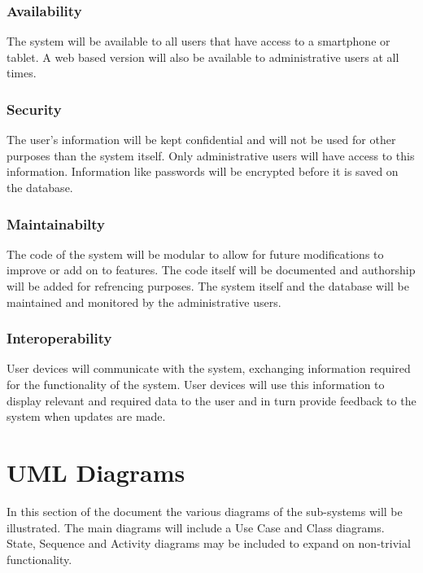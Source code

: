 \documentclass{article}
\begin{document}
		\subsubsection{Availability}
		The system will be available to all users that have access to a smartphone or tablet. A web based version will also be available to administrative users at all times.
		\subsubsection{Security}
		The user's information will be kept confidential and will not be used for other purposes than the system itself. Only administrative users will have access to this information. Information like passwords will be encrypted before it is saved on the database.
		\subsubsection{Maintainabilty}
		The code of the system will be modular to allow for future modifications to improve or add on to features. The code itself will be documented and authorship will be added for refrencing purposes. The system itself and the database will be maintained and monitored by the administrative users.
		\subsubsection{Interoperability}
		User devices will communicate with the system, exchanging information required for the functionality of the system. User devices will use this information to display relevant and required data to the user and in turn provide feedback to the system when updates are made.

\section{UML Diagrams}
In this section of the document the various diagrams of the sub-systems will be illustrated. The main diagrams will include a Use Case and Class diagrams. State, Sequence and Activity diagrams may be included to expand on non-trivial functionality.
\end{document}
